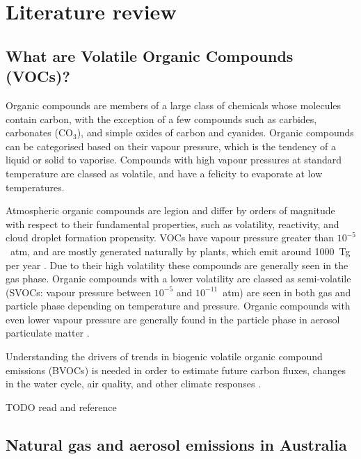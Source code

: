 
\chapter{Literature review} %
\label{ch1}

\section{What are Volatile Organic Compounds (VOCs)?}
\label{ch1:sec:what_are_vocs}
  Organic compounds are members of a large class of chemicals whose molecules contain carbon, with the exception of a few compounds such as carbides, carbonates (CO$_3$), and simple oxides of carbon and cyanides.
  Organic compounds can be categorised based on their vapour pressure, which is the tendency of a liquid or solid to vaporise.
  Compounds with high vapour pressures at standard temperature are classed as volatile, and have a felicity to evaporate at low temperatures.
  
  Atmospheric organic compounds are legion and differ by orders of magnitude with respect to their fundamental properties, such as volatility, reactivity, and cloud droplet formation propensity.
  VOCs have vapour pressure greater than $10^{-5}$~atm, and are mostly generated naturally by plants, which emit around 1000~Tg per year \citep{Guenther1995, Glasius2016}.
  Due to their high volatility these compounds are generally seen in the gas phase.
  Organic compounds with a lower volatility are classed as semi-volatile (SVOCs: vapour pressure between $10^{-5}$ and $10^{-11}$~atm) are seen in both gas and particle phase depending on temperature and pressure.
  Organic compounds with even lower vapour pressure are generally found in the particle phase in aerosol particulate matter \citep{Glasius2016}.

  Understanding the drivers of trends in biogenic volatile organic compound emissions (BVOCs) is needed in order to estimate future carbon fluxes, changes in the water cycle, air quality, and other climate responses \citep{Yue2015}.
  
  TODO read and reference \citep{Franco2015} 
  
\section{Natural gas and aerosol emissions in Australia}
\label{ch1:sec:emissions}

